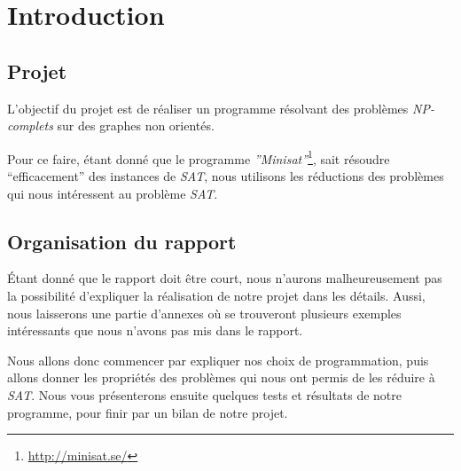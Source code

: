  \section{Introduction}

  \subsection{Projet}
  L'objectif du projet est de réaliser un programme résolvant des
  problèmes \emph{NP-complets} sur des graphes non orientés.

  Pour ce faire, étant donné que le programme
  \emph{''Minisat''}\footnote{\url{http://minisat.se/}}, sait résoudre
  ``efficacement'' des instances de \emph{SAT}, nous utilisons les
  réductions des problèmes qui nous intéressent au problème \emph{SAT}.

  \subsection{Organisation du rapport}
  Étant donné que le rapport doit être court, nous n'aurons
  malheureusement pas la possibilité d'expliquer la réalisation de notre 
  projet dans les détails. Aussi, nous laisserons une partie d'annexes
  où se trouveront plusieurs exemples intéressants que nous n'avons pas
  mis dans le rapport.

  Nous allons donc commencer par expliquer nos choix de programmation,
  puis allons donner les propriétés des problèmes qui nous ont permis de
  les réduire à \emph{SAT}. Nous vous présenterons ensuite quelques
  tests et résultats de notre programme, pour finir par un bilan de
  notre projet.